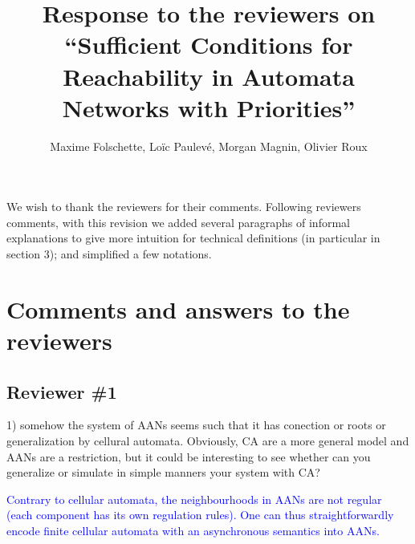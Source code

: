 \documentclass[11pt]{article}
\title{Response to the reviewers on “Sufficient Conditions for Reachability in Automata Networks with Priorities”}
\author{Maxime Folschette, Loïc Paulevé, Morgan Magnin, Olivier Roux}
\date{}
\newcommand{\ilanswer}[1]{\textcolor{blue}{#1}}
\begin{document}
\maketitle



We wish to thank the reviewers for their comments.
Following reviewers comments,
with this revision
we added
  several paragraphs of informal explanations to give more intuition 
  for technical definitions (in particular in section 3);
  and simplified a few notations.

\section*{Comments and answers to the reviewers}

\subsection*{Reviewer \#1}

1) somehow the system of AANs seems such that it has conection or roots or generalization by cellural automata. Obviously, CA are a more general model and AANs are a restriction, but it could be interesting to see whether can you generalize or simulate in simple manners your system with CA?

\ilanswer{
Contrary to cellular automata, the neighbourhoods in AANs are not regular
(each component has its own regulation rules).
One can thus straightforwardly encode finite cellular automata
with an asynchronous semantics into AANs.
}
\end{document}

